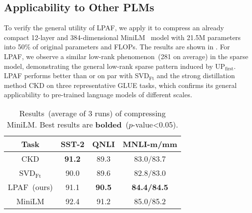 \subsection{Applicability to Other PLMs}
To verify the general utility of LPAF,  we apply  it to compress an already compact 12-layer and 384-dimensional MiniLM~\cite{minilm} model with 21.5M parameters into 50\% of original parameters and FLOPs. The results are shown in . For LPAF, we observe a similar low-rank phenomenon~(281 on average) in the sparse model, demonstrating the general low-rank sparse pattern induced by UP$_\text{first}$. LPAF performs better than or on par with SVD$_{\text{Ft}}$ and the strong distillation method CKD on three representative GLUE tasks, which confirms its general applicability to pre-trained language models of different scales.
%		


\begin{table}[t]
	\centering
	\scriptsize
	\begin{tabular}{c|ccc}
		\toprule
		Task & \textbf{SST-2}   & \textbf{QNLI}     & \textbf{MNLI-m/mm}         \\
		\midrule
		CKD       & \textbf{91.2}          & 89.3          & 83.0/83.7        \\
		
		\midrule
		SVD$_{\text{Ft}}$           & 90.0          & 89.6          & 82.8/83.0        \\
		LPAF~(ours)                  &91.1          & \textbf{90.5}          & \textbf{84.4/84.5}          \\
		\midrule
		MiniLM           & 92.4          & 91.2          & 85.0/85.2         \\
		\bottomrule
	\end{tabular}
	\caption{Results~(average of 3 runs) of  compressing MiniLM. Best results are \textbf{bolded}~($p$-value<0.05).}
	\label{table:roberta}
\end{table}


